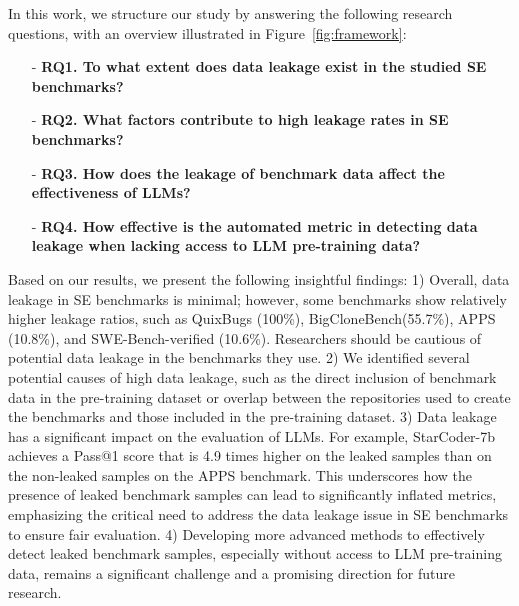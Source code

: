 In this work, we structure our study by answering the following research
questions, with an overview illustrated in Figure~\ref{fig:framework}:
\begin{itemize}[leftmargin=*]
\item[-]  \textbf{RQ1. To what extent does data leakage exist in the studied SE benchmarks?}
\item[-]  \textbf{RQ2. What factors contribute to high leakage rates in SE benchmarks?} 
\item[-]  \textbf{RQ3. How does the leakage of benchmark data affect the effectiveness of LLMs?}
\item[-]  \textbf{RQ4. How effective is the automated metric in detecting data leakage when lacking access to LLM pre-training data?}

\end{itemize}


Based on our results, we present the following insightful findings:
1) Overall, data leakage in SE benchmarks is minimal; however, some benchmarks show relatively higher leakage ratios, such as QuixBugs (100\%), BigCloneBench(55.7\%), APPS (10.8\%), and SWE-Bench-verified (10.6\%). Researchers should be cautious of potential data leakage in the benchmarks they use.
2) We identified several potential causes of high data leakage, such as the direct inclusion of benchmark data in the pre-training dataset or overlap between the repositories used to create the benchmarks and those included in the pre-training dataset.
3) Data leakage has a significant impact on the evaluation of LLMs. For example, StarCoder-7b achieves a Pass@1 score that is 4.9 times higher on the leaked samples than on the non-leaked samples on the APPS benchmark. This underscores how the presence of leaked benchmark samples can lead to significantly inflated metrics, emphasizing the critical need to address the data leakage issue in SE benchmarks to ensure fair evaluation.
4) Developing more advanced methods to effectively detect leaked benchmark samples, especially without access to LLM pre-training data, remains a significant challenge and a promising direction for future research. 



